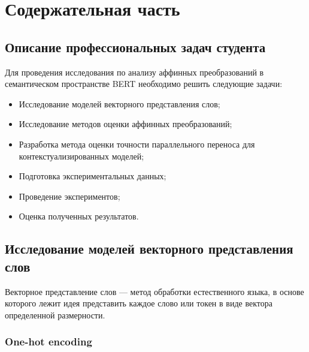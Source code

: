 \documentclass[a4paper,14pt]{article}
\begin{document}
	\pagebreak
	\section{Содержательная часть}
	
	\subsection{Описание профессиональных задач студента}
	
	
	Для проведения исследования по анализу аффинных преобразований в семантическом пространстве BERT необходимо решить следующие задачи:
	
	\begin{itemize}
		
		\item Исследование моделей векторного представления слов;
		
		\item Исследование методов оценки аффинных преобразований;
		
		
		\item Разработка метода оценки точности параллельного переноса для контекстуализированных моделей;
		
		\item Подготовка экспериментальных данных;
		
		\item Проведение экспериментов;
		
		\item Оценка полученных результатов.
		
	\end{itemize}
	
	
	\subsection{Исследование моделей векторного представления слов}
	
	Векторное представление слов — метод обработки естественного языка, в основе которого лежит идея представить каждое слово или токен в виде вектора определенной размерности.
	
	\subsubsection{One-hot encoding}
	
\end{document}

